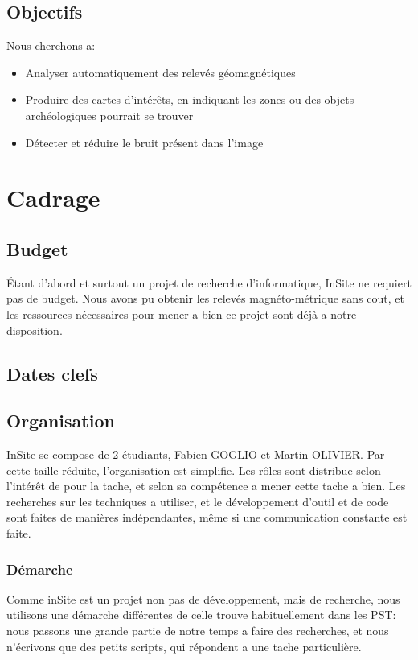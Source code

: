\documentclass[a4paper, 12pt, titlepage, oneside, french]{article}
\begin{document}
	\subsection{Objectifs}
	Nous cherchons a:
	\begin{itemize}
		\item Analyser automatiquement des relevés géomagnétiques 
		\item Produire des cartes d'intérêts, en indiquant les zones ou des objets archéologiques pourrait se trouver
		\item Détecter et réduire le bruit présent dans l'image
	\end{itemize}

	\newpage

\section{Cadrage}
	\subsection{Budget}
	Étant d'abord et surtout un projet de recherche d'informatique, InSite ne requiert pas de budget. Nous avons pu obtenir les relevés magnéto-métrique sans cout, et les ressources nécessaires pour mener a bien ce projet sont déjà a notre disposition. 
	\subsection{Dates clefs}
	\subsection{Organisation}
	InSite se compose de 2 étudiants, Fabien GOGLIO et Martin OLIVIER. Par cette taille réduite, l'organisation est simplifie. Les rôles sont distribue selon l'intérêt de pour la tache, et selon sa compétence a mener cette tache a bien. Les recherches sur les techniques a utiliser, et le développement d'outil et de code sont faites de manières indépendantes, même si une communication constante est faite. 
	\subsubsection{Démarche}
	Comme inSite est un projet non pas de développement, mais de recherche, nous utilisons une démarche différentes de celle trouve habituellement dans les PST: nous passons une grande partie de notre temps a faire des recherches, et nous n'écrivons que des petits scripts, qui répondent a une tache particulière.   
\end{document}
